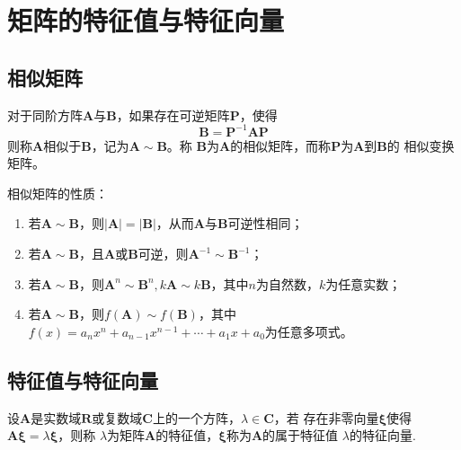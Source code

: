 \section{矩阵的特征值与特征向量}

\subsection{相似矩阵}
\begin{definition}[相似矩阵]
    对于同阶方阵$\boldsymbol{A}$与$\boldsymbol{B}$，如果存在可逆矩阵$\boldsymbol{P}$，使得
    $$\boldsymbol{B}=\boldsymbol{P}^{-1}\boldsymbol{AP}$$
    则称$\boldsymbol{A}${\heiti 相似}于$\boldsymbol{B}$，记为$\boldsymbol{A}\sim \boldsymbol{B}$。称
    $\boldsymbol{B}$为$\boldsymbol{A}$的{\heiti 相似矩阵}，而称$\boldsymbol{P}$为$\boldsymbol{A}$到$\boldsymbol{B}$的
    {\heiti 相似变换矩阵}。
\end{definition}

\begin{theorem}
    相似矩阵的性质：
    \begin{enumerate}[(1)]
        \item 若$\boldsymbol{A} \sim \boldsymbol{B}$，则$|\boldsymbol{A}|=|\boldsymbol{B}|$，从而$\boldsymbol{A}$与$\boldsymbol{B}$可逆性相同；
        \item 若$\boldsymbol{A} \sim \boldsymbol{B}$，且$\boldsymbol{A}$或$\boldsymbol{B}$可逆，则$\boldsymbol{A}^{-1} \sim \boldsymbol{B}^{-1}$；
        \item 若$\boldsymbol{A} \sim \boldsymbol{B}$，则$\boldsymbol{A}^n \sim \boldsymbol{B}^n,k\boldsymbol{A} \sim k\boldsymbol{B}$，其中$n$为自然数，$k$为任意实数；
        \item 若$\boldsymbol{A} \sim \boldsymbol{B}$，则$f(\boldsymbol{A})\sim f(\boldsymbol{B})$，其中$f(x)=a_nx^n+a_{n-1}x^{n-1}+\cdots+a_1x+a_0$为任意多项式。
    \end{enumerate}
\end{theorem}

\subsection{特征值与特征向量}
\begin{definition}
    设$\boldsymbol{A}$是实数域$\mathbf{R}$或复数域$\mathbf{C}$上的一个方阵，$\lambda\in \mathbf{C}$，若
    存在非零向量$\boldsymbol{\xi }$使得$\boldsymbol{A}\boldsymbol{\xi}=\lambda\boldsymbol{\xi}$，则称
    $\lambda$为矩阵$\boldsymbol{A}$的{\heiti 特征值}，$\boldsymbol{\xi}$称为$\boldsymbol{A}$的属于特征值
    $\lambda$的{\heiti 特征向量}.
\end{definition}

